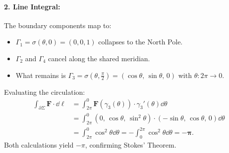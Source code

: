 \begin{exemple}
\paragraph{2. Line Integral:}
The boundary components map to:
\begin{itemize}
    \item $\Gamma_1 = \sigma(\theta, 0) = (0, 0, 1)$ collapses to the North Pole.
    \item $\Gamma_2$ and $\Gamma_4$ cancel along the shared meridian.
    \item What remains is $\Gamma_3 = \sigma\left(\theta, \tfrac{\pi}{2}\right) = (\cos\theta, \, \sin\theta, \, 0)$ with $\theta \colon 2\pi \to 0$.
\end{itemize}
Evaluating the circulation:
\begin{align*}
    \int_{\partial\Sigma} \mathbf{F} \cdot \dd\bm{\ell} &= \int_{2\pi}^0 \mathbf{F}(\gamma_3(\theta)) \cdot \gamma_3'(\theta) \dd\theta \\
    &= \int_{2\pi}^0 (0, \, \cos\theta, \, \sin^2\theta) \cdot (-\sin\theta, \, \cos\theta, \, 0) \dd\theta \\
    &= \int_{2\pi}^0 \cos^2\theta \dd\theta = -\int_0^{2\pi} \cos^2\theta \dd\theta = \mathbf{-\pi}.
\end{align*}
Both calculations yield $-\pi$, confirming Stokes' Theorem.
\end{exemple}